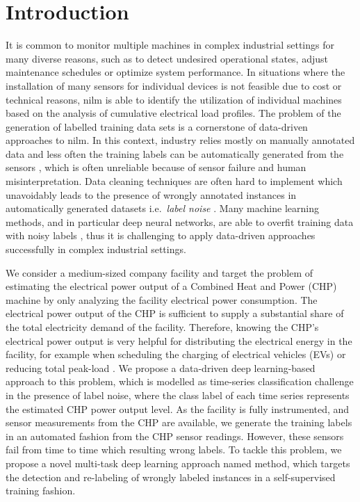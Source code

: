 \documentclass[runningheads, envcountsame, a4paper]{llncs}
\begin{document}
\section{Introduction}
It is common to monitor multiple machines in complex industrial settings for many diverse reasons, such as to detect undesired operational states, adjust maintenance schedules or optimize system performance.
In situations where the installation of many sensors for individual devices is not feasible due to cost or technical reasons, \acrfull{nilm} \cite{Holmegaard2016NILMIA} is able to identify the utilization of individual machines based on the analysis of cumulative electrical load profiles. 
The problem of the generation of labelled training data sets is a cornerstone of data-driven approaches to \acrshort{nilm}.
In this context,  industry  relies mostly on manually annotated data \cite{Fredriksson2020DataLA} and less often the training labels can be automatically generated from the sensors \cite{Gan2018AutomaticLF}, which is often unreliable because of sensor failure and  human misinterpretation.
Data cleaning techniques are often hard to implement \cite{Wang2020TimeSD} which unavoidably leads to the presence of wrongly annotated instances in automatically generated datasets i.e.\ \textit{label noise} \cite{frenay2013classification}. 
Many machine learning methods, and in particular deep neural networks, are able to overfit  training data with noisy labels \cite{zhang2016understanding}, thus it is challenging to apply data-driven approaches successfully in complex industrial settings.

We consider a medium-sized company facility and
 target the problem of estimating the electrical power output of a Combined Heat and Power (CHP) machine by only analyzing the facility electrical power consumption.
The electrical power output of the CHP is sufficient to supply a substantial share of the total electricity demand of the facility.
Therefore, knowing the CHP's electrical power output is very helpful for distributing the electrical energy in the facility, for example when scheduling the charging of electrical vehicles (EVs) or reducing total peak-load \cite{limmerEVCharging2019}.
We propose a data-driven deep learning-based approach to this problem, which is modelled as time-series classification challenge in the presence of label noise, where the class label of each time series represents the estimated CHP power output level.
As the facility is fully instrumented, and sensor measurements from the CHP are available, we generate the training labels in an automated fashion from the CHP sensor readings. 
However, these sensors fail from time to time which resulting wrong labels.
To tackle this problem, we propose a novel multi-task deep learning approach named \acrfull{method}, which targets the detection and re-labeling of wrongly labeled instances in a self-supervised training fashion.
\end{document}
